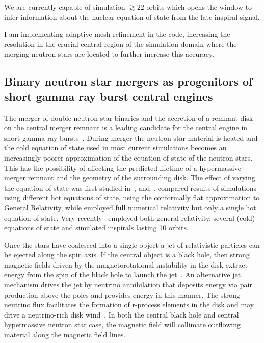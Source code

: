 \documentclass[12pt]{article}
\begin{document}
We are currently capable of simulation $\gtrsim 22$ orbits which opens the
window to infer information about the nuclear equation of state from the late
inspiral signal.

I am implementing
adaptive mesh refinement in the code, increasing the resolution in the crucial
central region of the simulation
domain where the merging neutron stars are located to further increase this
accuracy.

\subsection{Binary neutron star mergers as progenitors of short gamma ray burst
central engines} 
The merger of double neutron star binaries and the accretion of a remnant disk
on the central merger remnant is a leading
candidate for the central engine in short gamma ray
bursts~\cite{Tauris:2003pf}.
During merger the
neutron star material is heated and the cold equation of state 
used in most current simulations becomes an increasingly poorer approximation
of the equation of state of the neutron stars.
This has the
possibility of affecting the predicted lifetime of a hypermassive merger remnant and the
geometry of the surrounding disk. The effect of varying the equation of state 
was first studied
in~\cite{Oechslin:2006uk}, \cite{Sekiguchi:2011zd}
and~\cite{Hotokezaka:2013mm}.
\cite{Oechslin:2006uk} compared results of simulations using different hot
equations of state, using the conformally flat
approximation to General Relativity, while \cite{Sekiguchi:2011zd} employed
full numerical relativity but only a single hot equation of
state. Very recently~\cite{Hotokezaka:2013mm} employed both general
relativity, several (cold) equations of state and simulated inspirals lasting
10 orbits.

Once the stars have coalesced into a single object a jet of
relativistic particles can be ejected along the spin axis.
If the central object is a black hole, then strong magnetic fields
driven by the magnetorotational instability in
the disk extract energy from the spin of the black hole to launch the
jet~\cite{Blandford1977}.
An alternative jet mechanism drives the jet by neutrino annihilation that
deposits energy via pair production above the poles and
provides energy in this manner. The strong neutrino flux
facilitates the formation of r-process elements in the disk and may
drive a neutrino-rich disk wind~\cite{1999ApJ...525L.121F,Roberts:2010wh}.
In both the central black hole and central hypermassive
neutron star case, the magnetic field will collimate outflowing
material along the magnetic field lines.
\end{document}
